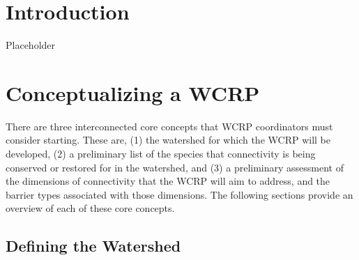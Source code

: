 \documentclass[
]{book}
\begin{document}
\hypertarget{intro}{%
\chapter{Introduction}\label{intro}}

Placeholder

\hypertarget{concept}{%
\chapter{Conceptualizing a WCRP}\label{concept}}

There are three interconnected core concepts that WCRP coordinators must consider starting. These are, (1) the watershed for which the WCRP will be developed, (2) a preliminary list of the species that connectivity is being conserved or restored for in the watershed, and (3) a preliminary assessment of the dimensions of connectivity that the WCRP will aim to address, and the barrier types associated with those dimensions. The following sections provide an overview of each of these core concepts.

\hypertarget{watershed}{%
\section{Defining the Watershed}\label{watershed}}
\end{document}

